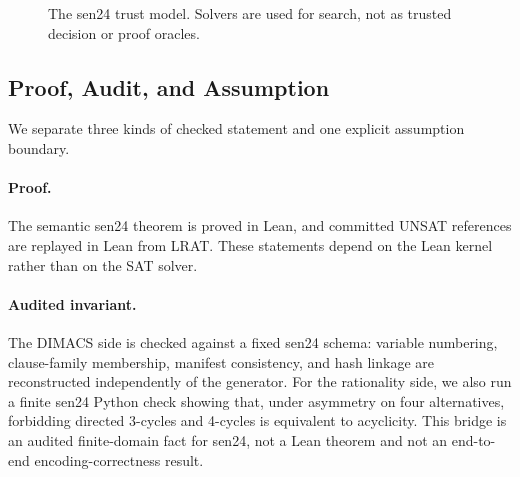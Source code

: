 \begin{figure}[t]
\centering
{}
\caption{The sen24 trust model. Solvers are used for search, not as trusted decision or proof oracles.}
\label{fig:chain-of-trust}
\end{figure}

\subsection{Proof, Audit, and Assumption}

We separate three kinds of checked statement and one explicit assumption boundary.

\paragraph{Proof.}
The semantic sen24 theorem is proved in Lean, and committed UNSAT references are replayed in Lean from LRAT. These statements depend on the Lean kernel rather than on the SAT solver.

\paragraph{Audited invariant.}
The DIMACS side is checked against a fixed sen24 schema: variable numbering, clause-family membership, manifest consistency, and hash linkage are reconstructed independently of the generator. For the rationality side, we also run a finite sen24 Python check showing that, under asymmetry on four alternatives, forbidding directed 3-cycles and 4-cycles is equivalent to acyclicity. This bridge is an audited finite-domain fact for sen24, not a Lean theorem and not an end-to-end encoding-correctness result.

